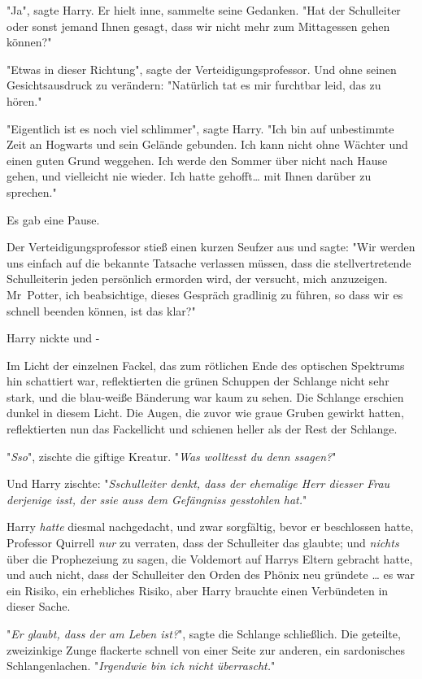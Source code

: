 {"Ja", sagte Harry. Er hielt inne, sammelte seine Gedanken. "Hat der Schulleiter oder sonst jemand Ihnen gesagt, dass wir nicht mehr zum Mittagessen gehen können?"

"Etwas in dieser Richtung", sagte der Verteidigungsprofessor. Und ohne seinen Gesichtsausdruck zu verändern: "Natürlich tat es mir furchtbar leid, das zu hören."

"Eigentlich ist es noch viel schlimmer", sagte Harry. "Ich bin auf unbestimmte Zeit an Hogwarts und sein Gelände gebunden. Ich kann nicht ohne Wächter und einen guten Grund weggehen. Ich werde den Sommer über nicht nach Hause gehen, und vielleicht nie wieder. Ich hatte gehofft… mit Ihnen darüber zu sprechen."

Es gab eine Pause.

Der Verteidigungsprofessor stieß einen kurzen Seufzer aus und sagte: "Wir werden uns einfach auf die bekannte Tatsache verlassen müssen, dass die stellvertretende Schulleiterin jeden persönlich ermorden wird, der versucht, mich anzuzeigen. Mr~Potter, ich beabsichtige, dieses Gespräch gradlinig zu führen, so dass wir es schnell beenden können, ist das klar?"

Harry nickte und -

Im Licht der einzelnen Fackel, das zum rötlichen Ende des optischen Spektrums hin schattiert war, reflektierten die grünen Schuppen der Schlange nicht sehr stark, und die blau-weiße Bänderung war kaum zu sehen. Die Schlange erschien dunkel in diesem Licht. Die Augen, die zuvor wie graue Gruben gewirkt hatten, reflektierten nun das Fackellicht und schienen heller als der Rest der Schlange.

"\emph{Sso}", zischte die giftige Kreatur. "\emph{Was wolltesst du denn ssagen?}"

Und Harry zischte: "\emph{Sschulleiter denkt, dass der ehemalige Herr diesser Frau derjenige isst, der ssie auss dem Gefängniss gesstohlen hat.}"

Harry \emph{hatte} diesmal nachgedacht, und zwar sorgfältig, bevor er beschlossen hatte, Professor Quirrell \emph{nur} zu verraten, dass der Schulleiter das glaubte; und \emph{nichts} über die Prophezeiung zu sagen, die Voldemort auf Harrys Eltern gebracht hatte, und auch nicht, dass der Schulleiter den Orden des Phönix neu gründete … es war ein Risiko, ein erhebliches Risiko, aber Harry brauchte einen Verbündeten in dieser Sache.

"\emph{Er glaubt, dass der am Leben ist?}", sagte die Schlange schließlich. Die geteilte, zweizinkige Zunge flackerte schnell von einer Seite zur anderen, ein sardonisches Schlangenlachen. "\emph{Irgendwie bin ich nicht überrascht.}"

}
